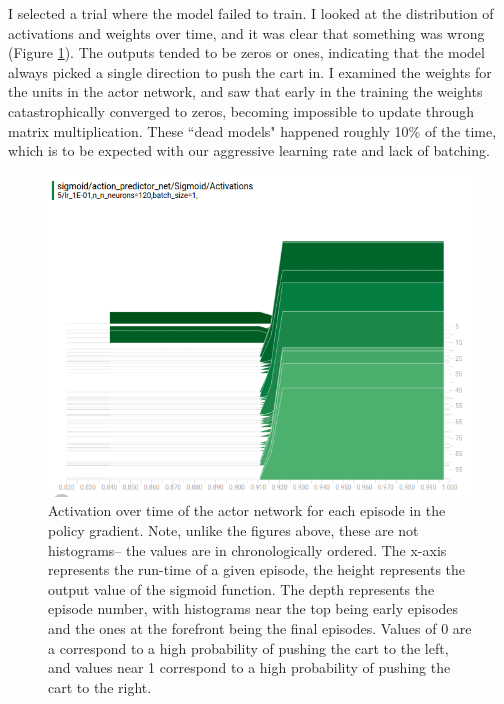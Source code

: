 \documentclass[12pt,a4paper]{article}
\begin{document}
I selected a trial where the model failed to train. I looked at the distribution of activations and weights over time, and it was clear that something was wrong (Figure \ref{pg_stuck}). The outputs tended to be zeros or ones, indicating that the model always picked a single direction to push the cart in. I examined the weights for the units in the actor network, and saw that early in the training the weights catastrophically converged to zeros, becoming impossible to update through matrix multiplication. These ``dead models" happened roughly 10\% of the time, which is to be expected with our aggressive learning rate and lack of batching.
 

\begin{figure}[htbp]
\begin{center}
\includegraphics[width=\linewidth]{pg_stuck.png}
\caption{Activation over time of the actor network for each episode in the policy gradient. Note, unlike the figures above, these are not histograms-- the values are in chronologically ordered. The x-axis represents the run-time of a given episode, the height represents the output value of the sigmoid function. The depth represents the episode number, with histograms near the top being early episodes and the ones at the forefront being the final episodes. Values of 0 are a correspond to a high probability of pushing the cart to the left, and values near 1 correspond to a high probability of pushing the cart to the right.}
\label{pg_stuck}
\end{center}
\end{figure}
\end{document}
